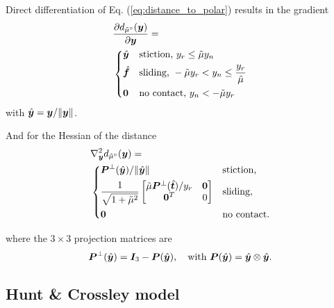 Direct differentiation of Eq. (\ref{eq:distance_to_polar}) results in the
gradient
\begin{align}
	&\frac{\partial{d_{\tilde{\mu}^\circ}(\vf{y})}}{\partial\vf{y}} = 
	\label{eq:gradient_distance_to_polar}\\
&\begin{dcases}
	\hat{\vf{y}} & \text{stiction, } y_r \le \tilde\mu y_n\\
	\hat{\vf{f}} & \text{sliding, } -\tilde\mu y_r < y_n \leq \frac{y_r}{\tilde\mu}\\
    \vf{0} & \text{no contact, } y_n < -\tilde\mu y_r
\end{dcases}\nonumber
\end{align}
with $\hat{{\bm{y}}}={\bm{y}}/\Vert{\bm{y}}\Vert$.

And for the Hessian of the distance
\begin{align}
	&\nabla_\vf{y}^2 d_{\tilde{\mu}^\circ}(\vf{y}) = 
	\label{eq:hessian_distance_to_polar}\\
&\begin{dcases}
	\vf{P}^\perp(\hat{\vf{y}})/\Vert\hat{\vf{y}}\Vert & 
	\text{stiction,}\\
	\frac{1}{\sqrt{1+\tilde\mu^2}}
	\begin{bmatrix}
		\tilde\mu\vf{P}^\perp(\hat{\vf{t}})/y_r & 
		\vf{0}\\
		\vf{0}^T & 
		0\\
	\end{bmatrix} &
	\text{sliding,}\\
    \vf{0} & \text{no contact.}
\end{dcases}\nonumber
\end{align}

where the $3\times 3$ projection matrices are
\begin{equation*}
	{\bm{P}}^\perp(\hat{{\bm{y}}})={\bm{I}}_3 - {\bm{P}}(\hat{{\bm{y}}}),
	\quad\text{with }
	{\bm{P}}(\hat{{\bm{y}}}) = \hat{{\bm{y}}}\otimes\hat{{\bm{y}}}\nonumber.
\end{equation*}

\subsection{Hunt \& Crossley model}

